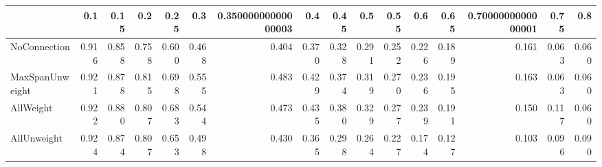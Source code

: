 \begin{tabular}{lrrrrrrrrrrrrrrr}
\toprule
{} &   0.1 &  0.15 &   0.2 &  0.25 &   0.3 & 0.35000000000000003 &   0.4 &  0.45 &   0.5 &  0.55 &   0.6 &  0.65 & 0.7000000000000001 &  0.75 &   0.8 \\
\midrule
NoConnection    & 0.916 & 0.858 & 0.758 & 0.600 & 0.468 &               0.404 & 0.370 & 0.328 & 0.291 & 0.252 & 0.226 & 0.189 &              0.161 & 0.063 & 0.060 \\
MaxSpanUnweight & 0.921 & 0.878 & 0.815 & 0.698 & 0.555 &               0.483 & 0.429 & 0.374 & 0.319 & 0.270 & 0.236 & 0.195 &              0.163 & 0.063 & 0.060 \\
AllWeight       & 0.922 & 0.880 & 0.807 & 0.683 & 0.544 &               0.473 & 0.435 & 0.380 & 0.329 & 0.277 & 0.239 & 0.191 &              0.150 & 0.117 & 0.060 \\
AllUnweight     & 0.924 & 0.874 & 0.807 & 0.653 & 0.498 &               0.430 & 0.365 & 0.298 & 0.264 & 0.227 & 0.174 & 0.127 &              0.103 & 0.096 & 0.090 \\
\bottomrule
\end{tabular}

